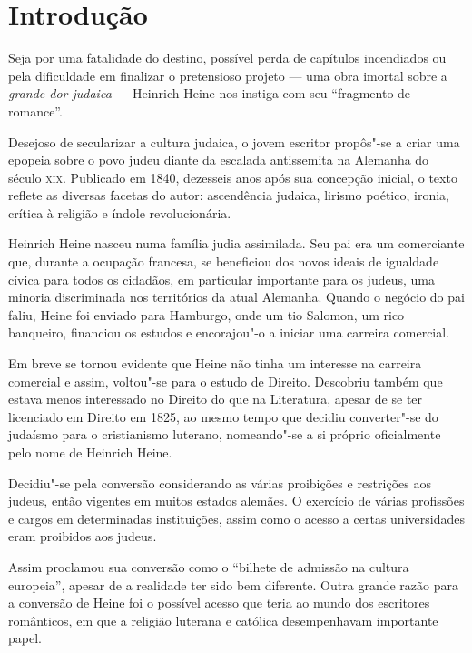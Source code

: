 \documentclass[12pt]{extarticle}
\begin{document}
\tableofcontents

\section{Introdução}

Seja por uma fatalidade do destino, possível perda de capítulos 
incendiados ou pela dificuldade em finalizar o pretensioso projeto --- uma 
obra imortal sobre a \emph{grande dor judaica} --- Heinrich Heine nos 
instiga com seu ``fragmento de romance''.

Desejoso de secularizar a cultura judaica, o jovem escritor propôs"-se 
a criar uma epopeia sobre o povo judeu diante da escalada antissemita 
na Alemanha do século \textsc{xix}.
Publicado em 1840, dezesseis anos após sua concepção inicial, 
o texto reflete as diversas facetas do autor:
ascendência judaica, lirismo poético, ironia, crítica 
à religião e índole revolucionária.

Heinrich Heine nasceu numa família judia assimilada. Seu pai era 
um comerciante que, durante a ocupação francesa, se beneficiou dos 
novos ideais de igualdade cívica para todos os cidadãos, 
em particular importante para os judeus, uma minoria 
discriminada nos territórios da atual Alemanha. 
Quando o negócio do pai faliu, Heine foi enviado 
para Hamburgo, onde um tio Salomon, um rico banqueiro, 
financiou os estudos e encorajou"-o a iniciar uma carreira comercial.

Em breve se tornou evidente que Heine não tinha um interesse 
na carreira comercial e assim, voltou"-se para o estudo de Direito. 
Descobriu também que estava menos interessado no Direito do que 
na Literatura, apesar de se ter licenciado em Direito em 1825, 
ao mesmo tempo que decidiu converter"-se do judaísmo para o 
cristianismo luterano, nomeando"-se a si próprio oficialmente pelo nome de Heinrich Heine.

Decidiu"-se pela conversão considerando as várias proibições e 
restrições aos judeus, então vigentes em muitos estados alemães. 
O exercício de várias profissões e cargos em determinadas 
instituições, assim como o acesso a certas universidades eram proibidos aos judeus. 

Assim proclamou sua conversão como o ``bilhete de admissão na cultura europeia'', 
apesar de a realidade ter sido bem diferente. Outra grande 
razão para a conversão de Heine foi o possível acesso que teria 
ao mundo dos escritores românticos, em que a religião luterana e 
católica desempenhavam importante papel.
\end{document}
